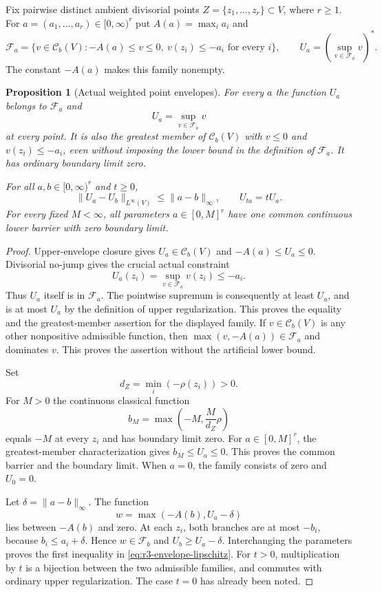 \documentclass[11pt,a4paper]{article}
\numberwithin{equation}{section}
\newtheorem{proposition}[theorem]{Proposition}
\theoremstyle{definition}
\theoremstyle{remark}
\newcommand{\Cb}{\mathcal C_b}
\begin{document}
Fix pairwise distinct ambient divisorial points
$Z=\{z_1,\ldots,z_r\}\subset V$, where $r\geq1$. For
$a=(a_1,\ldots,a_r)\in[0,\infty)^r$ put $A(a)=\max_i a_i$ and
\[
 \mathcal F_a=\{v\in\Cb(V):-A(a)\leq v\leq0,
                         \ v(z_i)\leq-a_i\text{ for every }i\},
 \qquad U_a=\left(\sup_{v\in\mathcal F_a}v\right)^*.
\]
The constant $-A(a)$ makes this family nonempty.

\begin{proposition}[Actual weighted point envelopes]
\label{prop:r3-weighted-point-envelope}
For every $a$ the function $U_a$ belongs to $\mathcal F_a$ and
\[
 U_a=\sup_{v\in\mathcal F_a}v
\]
at every point. It is also the greatest member of $\Cb(V)$ with
$v\leq0$ and $v(z_i)\leq-a_i$, even without imposing the lower
bound in the definition of $\mathcal F_a$. It has ordinary
boundary limit zero.

For all $a,b\in[0,\infty)^r$ and $t\geq0$,
\[
 \|U_a-U_b\|_{L^\infty(V)}\leq\|a-b\|_\infty,
 \qquad U_{ta}=tU_a.
 \tag{1}\label{eq:r3-envelope-lipschitz}
\]
For every fixed $M<\infty$, all parameters $a\in[0,M]^r$ have
one common continuous lower barrier with zero boundary limit.
\end{proposition}

\begin{proof}
Upper-envelope closure gives $U_a\in\Cb(V)$ and
$-A(a)\leq U_a\leq0$. Divisorial no-jump gives the crucial
actual constraint
\[
 U_a(z_i)=\sup_{v\in\mathcal F_a}v(z_i)\leq-a_i.
\]
Thus $U_a$ itself is in $\mathcal F_a$. The pointwise supremum
is consequently at least $U_a$, and is at most $U_a$ by the
definition of upper regularization. This proves the equality
and the greatest-member assertion for the displayed family.
If $v\in\Cb(V)$ is any other nonpositive admissible function,
then $\max(v,-A(a))\in\mathcal F_a$ and dominates $v$.
This proves the assertion without the artificial lower bound.

Set
\[
 d_Z=\min_i(-\rho(z_i))>0.
\]
For $M>0$ the continuous classical function
\[
 b_M=\max\left(-M,\frac{M}{d_Z}\rho\right)
\]
equals $-M$ at every $z_i$ and has boundary limit zero.
For $a\in[0,M]^r$, the greatest-member characterization gives
$b_M\leq U_a\leq0$. This proves the common barrier and the
boundary limit. When $a=0$, the family consists of zero and
$U_0=0$.

Let $\delta=\|a-b\|_\infty$. The function
\[
 w=\max(-A(b),U_a-\delta)
\]
lies between $-A(b)$ and zero. At each $z_i$, both branches
are at most $-b_i$, because $b_i\leq a_i+\delta$.
Hence $w\in\mathcal F_b$ and $U_b\geq U_a-\delta$.
Interchanging the parameters proves the first inequality in
\eqref{eq:r3-envelope-lipschitz}. For $t>0$, multiplication by
$t$ is a bijection between the two admissible families, and
commutes with ordinary upper regularization. The case $t=0$
has already been noted.
\end{proof}
\end{document}
